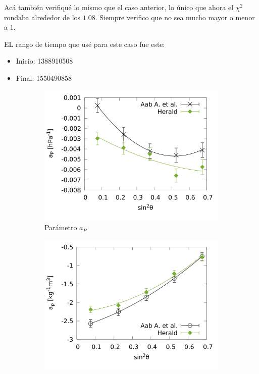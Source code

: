      Acá también verifiqué lo mismo que el caso anterior, lo único que ahora el $\chi^2$ rondaba alrededor de los $1.08$. Siempre verifico que no sea mucho mayor o menor a 1.

      EL rango de tiempo que usé para este caso fue este: 
      \begin{itemize}
        \item Inicio: 1388910508
        \item Final: 1550490858
      \end{itemize}
      
        \begin{figure}[H]
          \begin{subfigure}[b]{0.5\textwidth}
          \includegraphics[width=\linewidth]{../0_Introduccion/params/ap_2020_above_1EeV.png}
          \caption{Parámetro $a_P$ }
          \label{fig:ap_2020_1EeV}
          \end{subfigure}%
          \hspace{\fill}
          \begin{subfigure}[b]{0.5\textwidth}
          \includegraphics[width=\linewidth]{../0_Introduccion/params/arho_2020_above_1EeV.png}

\end{subfigure}
\end{figure}
